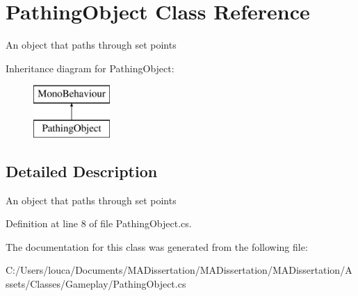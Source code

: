 \hypertarget{class_pathing_object}{}\section{Pathing\+Object Class Reference}
\label{class_pathing_object}


An object that paths through set points  


Inheritance diagram for Pathing\+Object\+:\begin{figure}[H]
\begin{center}
\leavevmode
\includegraphics[height=2.000000cm]{class_pathing_object}
\end{center}
\end{figure}


\subsection{Detailed Description}
An object that paths through set points 



Definition at line 8 of file Pathing\+Object.\+cs.



The documentation for this class was generated from the following file\+:\begin{DoxyCompactItemize}
\item 
C\+:/\+Users/louca/\+Documents/\+M\+A\+Dissertation/\+M\+A\+Dissertation/\+M\+A\+Dissertation/\+Assets/\+Classes/\+Gameplay/Pathing\+Object.\+cs\end{DoxyCompactItemize}
